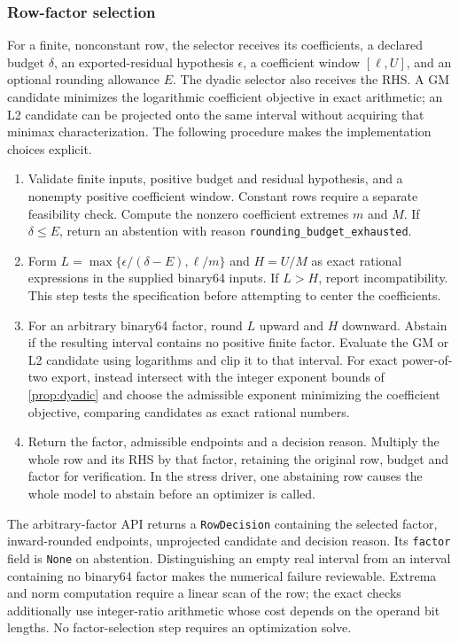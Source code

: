 \subsubsection{Row-factor selection}
For a finite, nonconstant row, the selector receives its coefficients, a declared budget
$\delta$, an exported-residual hypothesis $\epsilon$, a coefficient window $[\ell,U]$,
and an optional rounding allowance $E$. The dyadic selector also receives the RHS. A GM
candidate minimizes the logarithmic coefficient objective in exact arithmetic; an L2 candidate can be projected
onto the same interval without acquiring that minimax characterization.
The following procedure makes the implementation choices explicit.
\begin{enumerate}[label=\arabic*.,leftmargin=*,itemsep=3pt]
\item Validate finite inputs, positive budget and residual hypothesis, and a nonempty
positive coefficient window. Constant rows require a separate feasibility check.
Compute the nonzero coefficient extremes $m$ and $M$. If $\delta\le E$, return an
abstention with reason \texttt{rounding\_budget\_exhausted}.
\item Form $L=\max\{\epsilon/(\delta-E),\ell/m\}$ and $H=U/M$ as exact rational
expressions in the supplied binary64 inputs. If $L>H$, report incompatibility.
This step tests the specification before attempting to center the coefficients.
\item For an arbitrary binary64 factor, round $L$ upward and $H$ downward. Abstain if
the resulting interval contains no positive finite factor. Evaluate the GM or L2
candidate using logarithms and clip it to that interval. For exact power-of-two export,
instead intersect with the integer exponent bounds of \cref{prop:dyadic} and choose
the admissible exponent minimizing the coefficient objective, comparing candidates
as exact rational numbers.
\item Return the factor, admissible endpoints and a decision reason. Multiply the
whole row and its RHS by that factor, retaining the original row, budget and factor
for verification. In the stress driver, one abstaining row causes the whole model to
abstain before an optimizer is called.
\end{enumerate}

The arbitrary-factor API returns a \texttt{RowDecision} containing the selected factor,
inward-rounded endpoints, unprojected candidate and decision reason. Its \texttt{factor}
field is \texttt{None} on abstention. Distinguishing an empty real
interval from an interval containing no binary64 factor makes the numerical failure
reviewable. Extrema and norm computation require a linear scan of the row; the exact
checks additionally use integer-ratio arithmetic whose cost depends on the operand
bit lengths. No factor-selection step requires an optimization solve.

